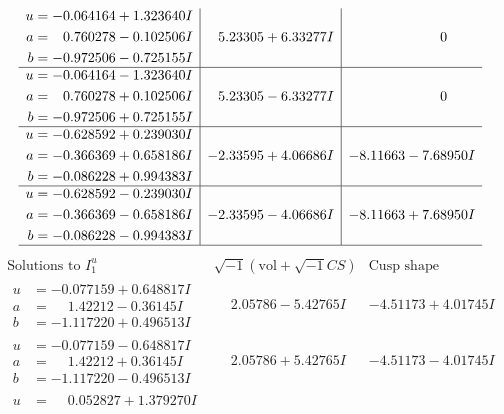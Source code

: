 \documentclass[1p]{elsarticle_modified}
\theoremstyle{definition}
\newcommand{\I}{\sqrt{-1}}
\begin{document}
$$\begin{array}{c|c|c}
\begin{aligned}
u &= -0.064164 + 1.323640 I \\
a &= \phantom{-}0.760278 - 0.102506 I \\
b &= -0.972506 - 0.725155 I\end{aligned}
 & \phantom{-}5.23305 + 6.33277 I & \phantom{-0.000000 } 0 \\ \hline\begin{aligned}
u &= -0.064164 - 1.323640 I \\
a &= \phantom{-}0.760278 + 0.102506 I \\
b &= -0.972506 + 0.725155 I\end{aligned}
 & \phantom{-}5.23305 - 6.33277 I & \phantom{-0.000000 } 0 \\ \hline\begin{aligned}
u &= -0.628592 + 0.239030 I \\
a &= -0.366369 + 0.658186 I \\
b &= -0.086228 + 0.994383 I\end{aligned}
 & -2.33595 + 4.06686 I & -8.11663 - 7.68950 I \\ \hline\begin{aligned}
u &= -0.628592 - 0.239030 I \\
a &= -0.366369 - 0.658186 I \\
b &= -0.086228 - 0.994383 I\end{aligned}
 & -2.33595 - 4.06686 I & -8.11663 + 7.68950 I\\
 \hline 
 \end{array}$$\newpage$$\begin{array}{c|c|c}  
\text{Solutions to }I^u_{1}& \I (\text{vol} + \sqrt{-1}CS) & \text{Cusp shape}\\
 \hline 
\begin{aligned}
u &= -0.077159 + 0.648817 I \\
a &= \phantom{-}1.42212 - 0.36145 I \\
b &= -1.117220 + 0.496513 I\end{aligned}
 & \phantom{-}2.05786 - 5.42765 I & -4.51173 + 4.01745 I \\ \hline\begin{aligned}
u &= -0.077159 - 0.648817 I \\
a &= \phantom{-}1.42212 + 0.36145 I \\
b &= -1.117220 - 0.496513 I\end{aligned}
 & \phantom{-}2.05786 + 5.42765 I & -4.51173 - 4.01745 I \\ \hline\begin{aligned}
u &= \phantom{-}0.052827 + 1.379270 I \\

\end{aligned}
\end{array}$$
\end{document}
